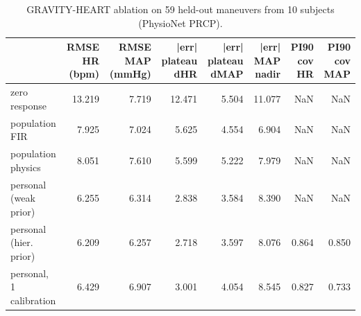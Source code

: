 \begin{table}
\caption{GRAVITY-HEART ablation on 59 held-out maneuvers from 10 subjects (PhysioNet PRCP).}
\label{tab:gravity_ablation}
\begin{tabular}{lrrrrrrr}
\toprule
 & RMSE HR (bpm) & RMSE MAP (mmHg) & |err| plateau dHR & |err| plateau dMAP & |err| MAP nadir & PI90 cov HR & PI90 cov MAP \\
\midrule
zero response & 13.219 & 7.719 & 12.471 & 5.504 & 11.077 & NaN & NaN \\
population FIR & 7.925 & 7.024 & 5.625 & 4.554 & 6.904 & NaN & NaN \\
population physics & 8.051 & 7.610 & 5.599 & 5.222 & 7.979 & NaN & NaN \\
personal (weak prior) & 6.255 & 6.314 & 2.838 & 3.584 & 8.390 & NaN & NaN \\
personal (hier. prior) & 6.209 & 6.257 & 2.718 & 3.597 & 8.076 & 0.864 & 0.850 \\
personal, 1 calibration & 6.429 & 6.907 & 3.001 & 4.054 & 8.545 & 0.827 & 0.733 \\
\bottomrule
\end{tabular}
\end{table}
